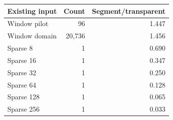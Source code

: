 \begin{tabular}{@{}lrr@{}}
\toprule
Existing input & Count & Segment/transparent\\
\midrule
Window pilot & 96 & 1.447\\
Window domain & 20,736 & 1.456\\
Sparse 8 & 1 & 0.690\\
Sparse 16 & 1 & 0.347\\
Sparse 32 & 1 & 0.250\\
Sparse 64 & 1 & 0.128\\
Sparse 128 & 1 & 0.065\\
Sparse 256 & 1 & 0.033\\
\bottomrule
\end{tabular}
